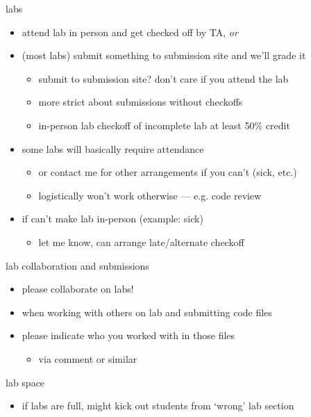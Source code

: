 \begin{frame}{labs}
    \begin{itemize}
    \item attend lab in person and get checked off by TA, \textit{or}
    \item (most labs) submit something to submission site and we'll grade it
        \begin{itemize}
        \item submit to submission site? don't care if you attend the lab
        \item more strict about submissions without checkoffs
        \item in-person lab checkoff of incomplete lab at least 50\% credit
        \end{itemize}
    \item some labs will basically require attendance
        \begin{itemize}
        \item or contact me for other arrangements if you can't (sick, etc.)
        \item logistically won't work otherwise --- e.g. code review
        \end{itemize}
    \item if can't make lab in-person (example: sick)
        \begin{itemize}
        \item let me know, can arrange late/alternate checkoff
        \end{itemize}
    \end{itemize}
\end{frame}

\begin{frame}{lab collaboration and submissions}
    \begin{itemize}
    \item please collaborate on labs!
    \vspace{.5cm}
    \item when working with others on lab and submitting code files
    \item please indicate who you worked with in those files
        \begin{itemize}
        \item via comment or similar
        \end{itemize}
    \end{itemize}
\end{frame}

\begin{frame}{lab space}
    \begin{itemize}
    \item if labs are full, might kick out students from `wrong' lab section
    \end{itemize}
\end{frame}
